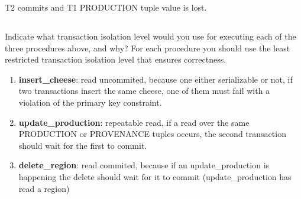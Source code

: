 T2 commits and T1 PRODUCTION tuple value is lost. 

\subsection{}
{\color{gray}Indicate what transaction isolation level would you use for executing each of the three procedures above, and why? For each procedure you should use the least restricted transaction isolation level that ensures correctness.}


\begin{enumerate}

	\item \textbf{insert\_cheese}: read uncommited, because one either serializable or not, if two transactions insert the same cheese, one of them must fail with a violation of the primary key constraint.

	\item \textbf{update\_production}: repeatable read, if a read over the same PRODUCTION or PROVENANCE tuples occurs, the second transaction should wait for the first to commit.

	\item \textbf{delete\_region}: read commited, because if an update\_production is happening the delete should wait for it to commit (update\_production has read a region)

\end{enumerate}
